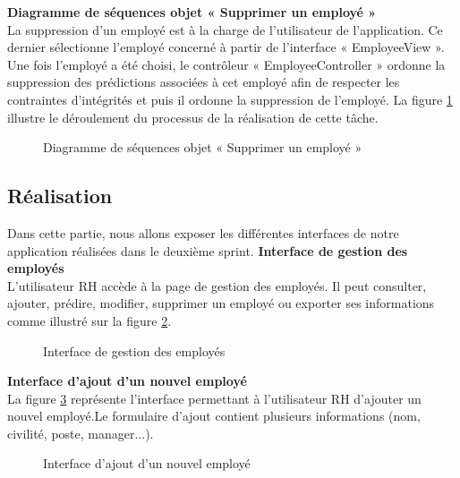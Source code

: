        \newpage

\textbf{Diagramme de séquences objet « Supprimer un employé »}\\
La suppression d’un employé est à la charge de l’utilisateur de l’application. Ce dernier sélectionne l'employé concerné à partir de l’interface « EmployeeView ». Une fois l'employé a été choisi, le contrôleur « EmployeeController » ordonne la suppression des prédictions associées à cet employé afin de respecter les contraintes d’intégrités et puis il ordonne la suppression de l'employé.\newline
La figure \ref{fig:seqobjetsupprimeremploye} illustre le déroulement du processus de la réalisation de cette tâche.
    \begin{figure}[htpb]
    \centering
    \caption{Diagramme de séquences objet « Supprimer un employé »}
    \label{fig:seqobjetsupprimeremploye}
    \end{figure}
    

\subsection{Réalisation}
Dans cette partie, nous allons exposer les différentes interfaces de notre application réalisées dans le deuxième
sprint.\newline
\textbf{Interface de gestion des employés}\\
L'utilisateur RH accède à la page de gestion des employés. Il peut consulter, ajouter, prédire, modifier, supprimer un employé ou exporter ses informations comme illustré sur la figure \ref{fig:realisationPFe_sprint2_0}.
\newpage

    \begin{figure}[htpb]
    \centering
    \caption{Interface de gestion des employés}
    \label{fig:realisationPFe_sprint2_0}
    \end{figure}

\textbf{Interface d'ajout d'un nouvel employé}\\
La figure \ref{fig:realisationPFe_sprint2_2} représente l'interface permettant à l'utilisateur RH d'ajouter un nouvel employé.\newline Le formulaire d'ajout contient plusieurs informations (nom, civilité, poste, manager...).
    \begin{figure}[htpb]
    \centering
    \caption{Interface d'ajout d'un nouvel employé}
    \label{fig:realisationPFe_sprint2_2}
    \end{figure}
 
